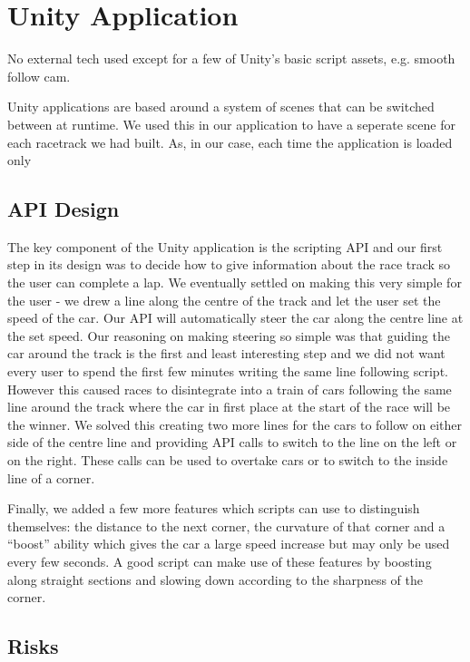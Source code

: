 \section{Unity Application}
No external tech used except for a few of Unity's basic script assets, e.g. smooth follow cam.


Unity applications are based around a system of scenes that can be switched between at runtime. We used this in our application to have a seperate scene for each racetrack we had built. As, in our case, each time the application is loaded only

\subsection{API Design}
The key component of the Unity application is the scripting API and our first step in its design was to decide how to give information about the race track so the user can complete a lap. We eventually settled on making this very simple for the user - we drew a line along the centre of the track and let the user set the speed of the car. Our API will automatically steer the car along the centre line at the set speed. Our reasoning on making steering so simple was that guiding the car around the track is the first and least interesting step and we did not want every user to spend the first few minutes writing the same line following script. However this caused races to disintegrate into a train of cars following the same line around the track where the car in first place at the start of the race will be the winner. We solved this creating two more lines for the cars to follow on either side of the centre line and providing API calls to switch to the line on the left or on the right. These calls can be used to overtake cars or to switch to the inside line of a corner.

Finally, we added a few more features which scripts can use to distinguish themselves: the distance to the next corner, the curvature of that corner and a ``boost'' ability which gives the car a large speed increase but may only be used every few seconds. A good script can make use of these features by boosting along straight sections and slowing down according to the sharpness of the corner.

\subsection{Risks}

